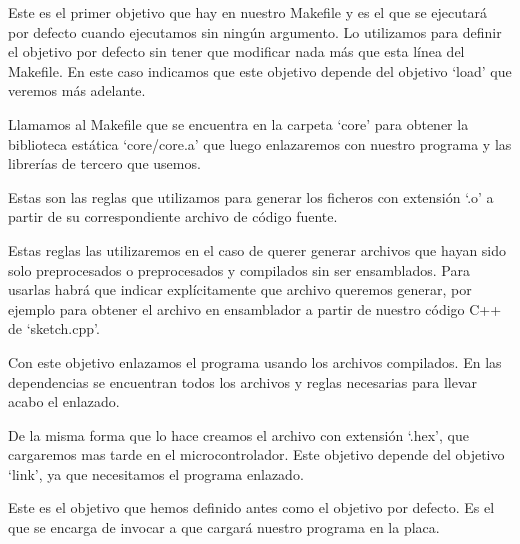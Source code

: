 
Este es el primer objetivo que hay en nuestro Makefile y es el que se ejecutará por defecto cuando ejecutamos  sin ningún argumento. Lo utilizamos para definir el objetivo por defecto sin tener que modificar nada más que esta línea del Makefile. En este caso indicamos que este objetivo depende del objetivo `load' que veremos más adelante.


Llamamos al Makefile que se encuentra en la carpeta `core' para obtener la biblioteca estática `core/core.a' que luego enlazaremos con nuestro programa y las librerías de tercero que usemos.


Estas son las reglas que utilizamos para generar los ficheros con extensión `.o' a partir de su correspondiente archivo de código fuente.


Estas reglas las utilizaremos en el caso de querer generar archivos que hayan sido solo preprocesados o preprocesados y compilados sin ser ensamblados. Para usarlas habrá que indicar explícitamente que archivo queremos generar, por ejemplo  para obtener el archivo en ensamblador a partir de nuestro código C++ de `sketch.cpp'.


Con este objetivo enlazamos el programa usando los archivos compilados. En las dependencias se encuentran todos los archivos y reglas necesarias para llevar acabo el enlazado.


De la misma forma que lo hace  creamos el archivo con extensión `.hex', que cargaremos mas tarde en el microcontrolador. Este objetivo depende del objetivo `link', ya que necesitamos el programa enlazado.


Este es el objetivo que hemos definido antes como el objetivo por defecto. Es el que se encarga de invocar a  que cargará nuestro programa en la placa.

